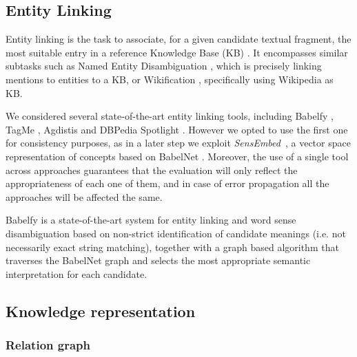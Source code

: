 \subsection{Entity Linking} %
%
Entity linking is the task to associate, for a given candidate textual fragment, the most suitable entry in a reference Knowledge Base (KB) \cite{Moroetal2014b}. It encompasses similar subtasks such as Named Entity Disambiguation \cite{BunescuandPasca2006}, which is precisely linking mentions to entities to a KB, or Wikification \cite{MihalceaandCsomai2007}, specifically using Wikipedia as KB.

We considered several state-of-the-art entity linking tools, including Babelfy \cite{Moroetal2014b}, TagMe \cite{Ferraginaetal2010}, Agdistis \cite{Usbecketal2014} and DBPedia Spotlight \cite{Mendes2011}. However we opted to use the first one for consistency purposes, as in a later step we exploit \textit{SensEmbed}~\cite{Iacobaccietal2015}, a vector space representation of concepts based on BabelNet \cite{Navigli2010}. Moreover, the use of a single tool across approaches guarantees that the evaluation will only reflect the appropriateness of each one of them, and in case of error propagation all the approaches will be affected the same.

Babelfy \cite{Moroetal2014b} is a state-of-the-art system for entity linking and word sense disambiguation based on non-strict identification of candidate meanings (i.e. not necessarily exact string matching), together with a graph based algorithm that traverses the BabelNet graph and selects the most appropriate semantic interpretation for each candidate.

\subsection{Knowledge representation}\label{sec:knowledge_representations}

\subsubsection{Relation graph}\label{sec:rel_graph} %

